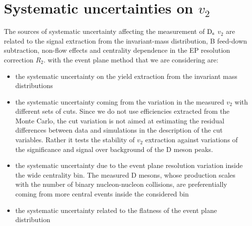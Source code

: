 \section{Systematic uncertainties on $v_2$}
\label{sec:systsectionV2}
The sources of systematic uncertainty affecting the measurement of 
${\rm D_s}$ $v_2$ are related to the signal extraction from the invariant-mass
distribution, B feed-down subtraction, non-flow effects 
and centrality dependence in the EP resolution correction $R_2$.
with the event plane method that we are considering are:
\begin{itemize}
\item{the systematic uncertainty on the yield extraction from the invariant mass distributions}
\item{the systematic uncertainty coming from the variation 
in the measured $v_2$ with different sets of cuts. Since we do not use efficiencies extracted 
from the Monte Carlo, the cut variation is not aimed at estimating the residual
differences between data and simulations in the description of the cut 
variables. Rather it tests the stability of $v_2$ extraction against variations
of the significance and signal over background of the D meson peaks.}
\item{the systematic uncertainty due to the event plane resolution variation 
inside the wide centrality bin. The measured D mesons, whose production 
scales with the number of binary nucleon-nucleon collisions, are preferentially
coming from more central events inside the considered bin}
\item{the systematic uncertainty related to the flatness of the event plane distribution}
\end{itemize}

